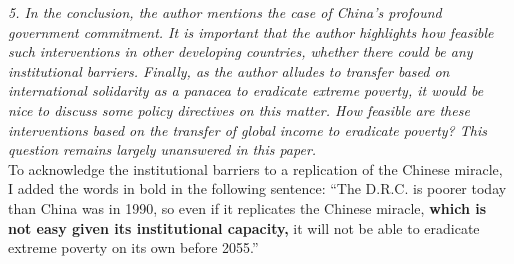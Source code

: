 \documentclass[12pt,english]{article}
\begin{document}
\textit{5. In the conclusion, the author mentions the case of China's profound government commitment. It is important that the author highlights how feasible such interventions in other developing countries, whether there could be any institutional barriers. Finally, as the author alludes to transfer based on international solidarity as a panacea to eradicate extreme poverty, it would be nice to discuss some policy directives on this matter. How feasible are these interventions based on the transfer of global income to eradicate poverty? This question remains largely unanswered in this paper.}~\\

To acknowledge the institutional barriers to a replication of the Chinese miracle, I added the words in bold in the following sentence: ``The D.R.C. is poorer today than China was in 1990, 
so even if it replicates the Chinese miracle, \textbf{which is not easy given its institutional capacity,} it will not be able to eradicate extreme poverty on its own before 2055.''
\end{document}
